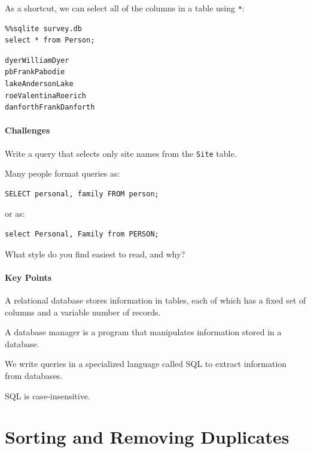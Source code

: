 \documentclass{book}
\begin{document}
As a shortcut, we can select all of the columns in a table using
\texttt{*}:

\begin{verbatim}
%%sqlite survey.db
select * from Person;
\end{verbatim}

\begin{verbatim}
dyerWilliamDyer
pbFrankPabodie
lakeAndersonLake
roeValentinaRoerich
danforthFrankDanforth
\end{verbatim}

\mbox{}\paragraph{Challenges}

\begin{swcenumerate}
\item
  Write a query that selects only site names from the \texttt{Site}
  table.
\item
  Many people format queries as:

\begin{verbatim}
SELECT personal, family FROM person;
\end{verbatim}

  or as:

\begin{verbatim}
select Personal, Family from PERSON;
\end{verbatim}

  What style do you find easiest to read, and why?
\end{swcenumerate}

\mbox{}\paragraph{Key Points}

\begin{swcitemize}
\item
  A relational database stores information in tables, each of which has
  a fixed set of columns and a variable number of records.
\item
  A database manager is a program that manipulates information stored in
  a database.
\item
  We write queries in a specialized language called SQL to extract
  information from databases.
\item
  SQL is case-insensitive.
\end{swcitemize}

\section{Sorting and Removing Duplicates}
\end{document}
